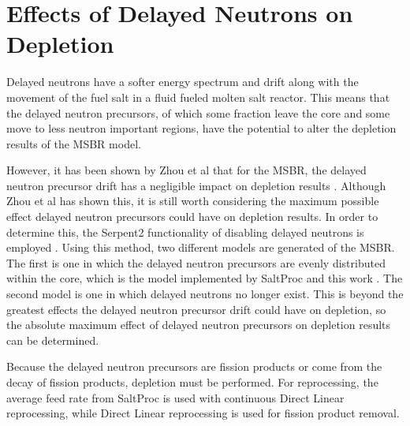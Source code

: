 






\section{Effects of Delayed Neutrons on Depletion}

Delayed neutrons have a softer energy spectrum and drift along with the movement of the fuel salt in a fluid fueled molten salt reactor. This means that the delayed neutron precursors, of which some fraction leave the core and some move to less neutron important regions, have the potential to alter the depletion results of the MSBR model.

However, it has been shown by Zhou et al that for the MSBR, the delayed neutron precursor drift has a negligible impact on depletion results \cite{zhou_fuel_2018}. Although Zhou et al has shown this, it is still worth considering the maximum possible effect delayed neutron precursors could have on depletion results. In order to determine this, the Serpent2 functionality of disabling delayed neutrons is employed \cite{leppanen_serpent_2015}. Using this method, two different models are generated of the MSBR. The first is one in which the delayed neutron precursors are evenly distributed within the core, which is the model implemented by SaltProc and this work \cite{rykhlevskii_modeling_2019}. The second model is one in which delayed neutrons no longer exist. This is beyond the greatest effects the delayed neutron precursor drift could have on depletion, so the absolute maximum effect of delayed neutron precursors on depletion results can be determined.

Because the delayed neutron precursors are fission products or come from the decay of fission products, depletion must be performed. For reprocessing, the average feed rate from SaltProc is used with continuous Direct Linear reprocessing, while Direct Linear reprocessing is used for fission product removal. 

